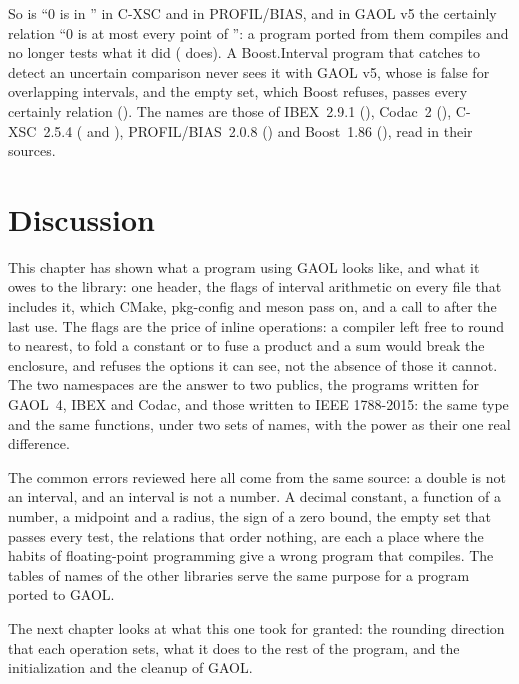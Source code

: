 \documentclass[12pt,a4paper,twoside,openright]{book}
\begin{document}
\noindent
So  is ``0 is in '' in C-XSC and in PROFIL/BIAS, and in
GAOL v5 the certainly relation ``0 is at most every point of '': a
program ported from them compiles and no longer tests what it did
( does). A Boost.Interval program that catches
 to detect an uncertain comparison never sees it with
GAOL v5, whose  is false for overlapping intervals, and the empty
set, which Boost refuses, passes every certainly relation
(). The names are those of IBEX~2.9.1
(), Codac~2 (), C-XSC~2.5.4
( and ), PROFIL/BIAS~2.0.8
() and Boost~1.86 (), read in
their sources.

\section{Discussion}

This chapter has shown what a program using GAOL looks like, and what it owes
to the library: one header, the flags of interval arithmetic on every file
that includes it, which CMake, pkg-config and meson pass on, and a call to
 after the last use. The flags are the price of inline
operations: a compiler left free to round to nearest, to fold a constant or
to fuse a product and a sum would break the enclosure, and
 refuses the options it can see, not the absence of
those it cannot. The two namespaces are the answer to two publics, the
programs written for GAOL~4, IBEX and Codac, and those written to IEEE
1788-2015: the same type and the same functions, under two sets of names,
with the power as their one real difference.

\medskip
The common errors reviewed here all come from the same source: a double is
not an interval, and an interval is not a number. A decimal constant, a
function of a number, a midpoint and a radius, the sign of a zero bound, the
empty set that passes every test, the relations that order nothing, are
each a place where the habits of floating-point programming give a wrong
program that compiles. The tables of names of the other libraries serve the
same purpose for a program ported to GAOL.

\medskip
The next chapter looks at what this one took for granted: the rounding
direction that each operation sets, what it does to the rest of the program,
and the initialization and the cleanup of GAOL.
\end{document}
